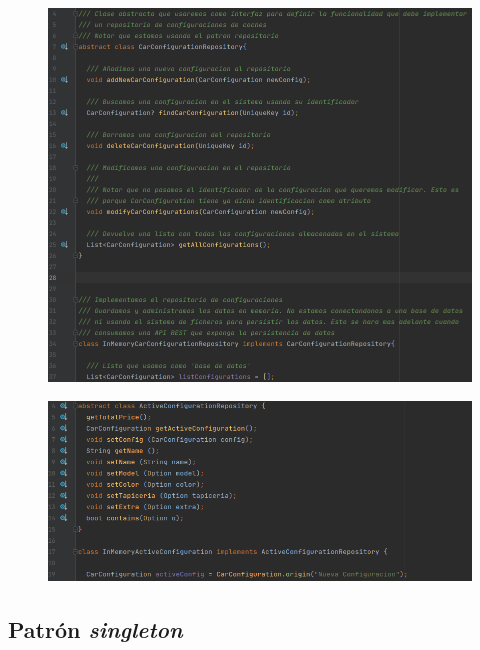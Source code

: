 \begin{figure}[H]
    \centering
    \includegraphics[scale=0.55]{imagenes/ds-repository1.png}
\end{figure}
\begin{figure}[H]
    \centering
    \includegraphics[scale=0.55]{imagenes/ds-repository2.png}
\end{figure}

\newpage

\subsection{Patrón \emph{singleton}}

